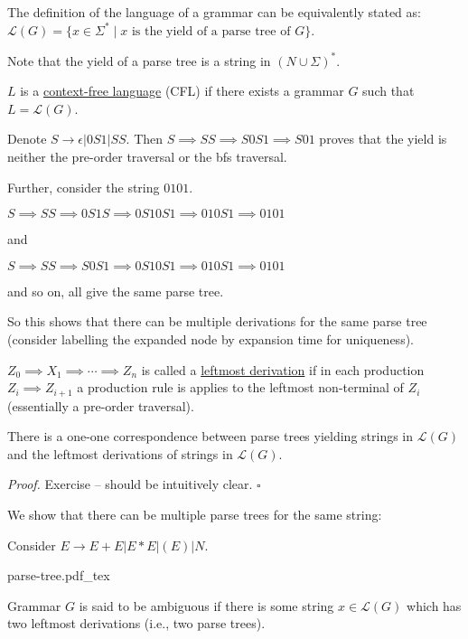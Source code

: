 \documentclass[a4paper]{article}
\newenvironment{proof}{\begin{breakbox}\textit{Proof.}}{\hfill$\square$\end{breakbox}}
\newcommand{\mc}{\mathcal}
\renewcommand{\L}{\mc{L}}
\newcommand{\produces}{\implies}
\newcommand{\incfig}[1]{%
    \def\svgwidth{\columnwidth}
    {#1.pdf_tex}
}
\begin{document}
\begin{defn}
    The definition of the language of a grammar can be equivalently stated as: $\L(G) = \{x \in \Sigma^* \mid x \text{ is the yield of a parse tree of }G\}$.
\end{defn}

\begin{note}
    Note that the yield of a parse tree is a string in $(N \cup \Sigma)^*$.
\end{note}

\begin{defn}
    $L$ is a \underline{context-free language} (CFL) if there exists a grammar $G$ such that $L = \L(G)$.
\end{defn}

\begin{eg}
    Denote $S \to \epsilon | 0S1 | SS$. Then $S \produces SS \produces S0S1 \produces S01$ proves that the yield is neither the pre-order traversal or the bfs traversal.

    Further, consider the string $0101$.

    $S \produces SS \produces 0S1S \produces 0S10S1 \produces 010S1 \produces 0101$

    and

    $S \produces SS \produces S0S1 \produces 0S10S1 \produces 010S1 \produces 0101$

    and so on, all give the same parse tree.

    So this shows that there can be multiple derivations for the same parse tree (consider labelling the expanded node by expansion time for uniqueness).
\end{eg}

\begin{defn}
    $Z_0 \produces X_1 \produces \cdots \produces Z_n$ is called a \underline{leftmost derivation} if in each production $Z_i \produces Z_{i+1}$ a production rule is applies to the leftmost
    non-terminal of $Z_i$ (essentially a pre-order traversal).
\end{defn}

\begin{claim}
    There is a one-one correspondence between parse trees yielding strings in $\L(G)$ and the leftmost derivations of strings in $\L(G)$.
\end{claim}

\begin{proof}
    Exercise -- should be intuitively clear.
\end{proof}

We show that there can be multiple parse trees for the same string:

Consider $E \to E + E | E * E | (E) | N$.
 
\incfig{parse-tree}

\begin{defn}
    Grammar $G$ is said to be ambiguous if there is some string $x \in \L(G)$ which has two leftmost derivations (i.e., two parse trees).
\end{defn}
\end{document}
